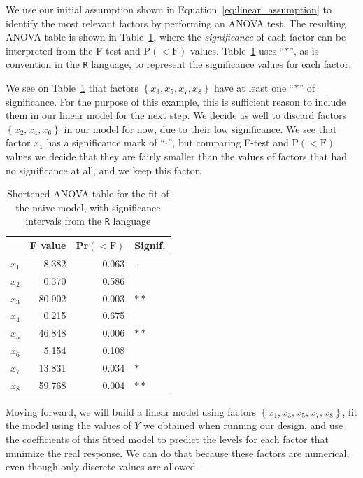 \documentclass[conference]{IEEEtran}
\begin{document}
We use our initial assumption shown in
Equation~\eqref{eq:linear_assumption} to identify the most relevant
factors by performing an ANOVA test. The resulting ANOVA table is shown in
Table~\ref{tab:anova_linear}, where the \emph{significance} of each factor can
be interpreted from the F-test and P\((<\text{F})\) values.
Table~\ref{tab:anova_linear} uses ``\(*\)'', as is convention in the
\texttt{R} language, to represent the significance values for each factor.

We see on Table~\ref{tab:anova_linear} that factors
\(\left\{x_3,x_5,x_7,x_8\right\}\) have at least one ``\(*\)'' of significance. For
the purpose of this example, this is sufficient reason to include them in our
linear model for the next step. We decide as well to discard factors
\(\left\{x_2,x_4,x_6\right\}\) in our model for now, due to their low
significance. We see that factor \(x_1\) has a significance mark of ``\(\cdot\)'', but
comparing F-test and P\((<\text{F})\) values we decide that they are fairly
smaller than the values of factors that had no significance at all, and we keep
this factor.

\begin{table}[t]
\centering
\caption{Shortened ANOVA table for the fit of the naive model, with significance intervals from the \texttt{R} language}
\label{tab:anova_linear}
\begingroup\small
\begin{tabular}{lrrl}
  \toprule
 & F value & Pr$(<\text{F})$ & Signif. \\
  \midrule
$x_1$ & 8.382 & 0.063 & $\cdot$ \\
  $x_2$ & 0.370 & 0.586 &   \\
  $x_3$ & 80.902 & 0.003 & $**$ \\
  $x_4$ & 0.215 & 0.675 &   \\
  $x_5$ & 46.848 & 0.006 & $**$ \\
  $x_6$ & 5.154 & 0.108 &   \\
  $x_7$ & 13.831 & 0.034 & $*$ \\
  $x_8$ & 59.768 & 0.004 & $**$ \\
   \bottomrule
\end{tabular}
\endgroup
\end{table}

Moving forward, we will build a linear model using factors
\(\left\{x_1,x_3,x_5,x_7,x_8\right\}\), fit the model using the values of \(Y\) we
obtained when running our design, and use the coefficients of this fitted model
to predict the levels for each factor that minimize the real response. We can do
that because these factors are numerical, even though only discrete values are
allowed.
\end{document}
